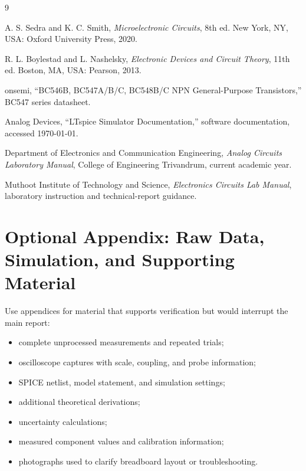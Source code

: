 \documentclass[11pt,a4paper]{article}
\begin{document}
\begin{thebibliography}{9}

A. S. Sedra and K. C. Smith,
\textit{Microelectronic Circuits}, 8th ed.
New York, NY, USA: Oxford University Press, 2020.

R. L. Boylestad and L. Nashelsky,
\textit{Electronic Devices and Circuit Theory}, 11th ed.
Boston, MA, USA: Pearson, 2013.

onsemi,
``BC546B, BC547A/B/C, BC548B/C NPN General-Purpose Transistors,''
BC547 series datasheet.

Analog Devices,
``LTspice Simulator Documentation,''
software documentation, accessed \today.

Department of Electronics and Communication Engineering,
\textit{Analog Circuits Laboratory Manual},
College of Engineering Trivandrum, current academic year.

Muthoot Institute of Technology and Science,
\textit{Electronics Circuits Lab Manual},
laboratory instruction and technical-report guidance.

\end{thebibliography}

\appendix

\section{Optional Appendix: Raw Data, Simulation, and Supporting Material}

Use appendices for material that supports verification but would interrupt
the main report:
\begin{itemize}
  \item complete unprocessed measurements and repeated trials;
  \item oscilloscope captures with scale, coupling, and probe information;
  \item SPICE netlist, model statement, and simulation settings;
  \item additional theoretical derivations;
  \item uncertainty calculations;
  \item measured component values and calibration information;
  \item photographs used to clarify breadboard layout or troubleshooting.
\end{itemize}
\end{document}
